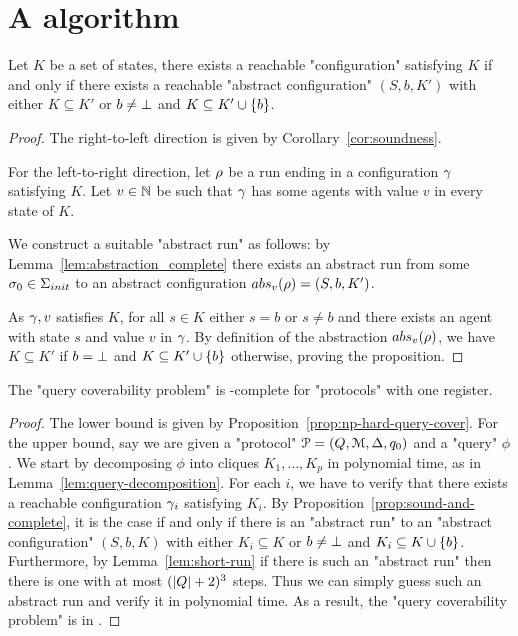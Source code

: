 \section{A \NP algorithm}

\begin{proposition}
	\label{prop:sound-and-complete}
	Let $K$ be a set of states, there exists a reachable "configuration" satisfying $K$ if and only if there exists a reachable "abstract configuration" $(S,b,K')$ with either $K \subseteq K'$ or $b \neq \bot$ and $K \subseteq K' \cup \{b\}$.  
\end{proposition}

\begin{proof}
	The right-to-left direction is given by Corollary~\ref{cor:soundness}.
	
	For the left-to-right direction, let $\rho$ be a run ending in a configuration $\gamma$ satisfying $K$. Let $v \in \mathbb{N}$ be such that $\gamma$ has some agents with value $v$ in every state of $K$.
	
	We construct a suitable "abstract run" as follows: by Lemma~\ref{lem:abstraction_complete} there exists an abstract run from some $\sigma_0 \in \aconfiginitset$ to an abstract configuration $\absproj{v}{\run} = (S, b, K')$.
	
	As $\gamma, v$ satisfies $K$, for all $s \in K$ either $s = b$ or $s \neq b$ and there exists an agent with state $s$ and value $v$ in $\gamma$. 	
	By definition of the abstraction $\absproj{v}{\run}$, we have $K \subseteq K'$ if $b=\bot$ and $K \subseteq K' \cup \{b\}$ otherwise, proving the proposition.
\end{proof}

\begin{theorem}
	\label{thm:np-complete-query-cover}
	The "query coverability problem" is \NP-complete for "protocols" with one register.
\end{theorem}

\begin{proof}
	The lower bound is given by Proposition~\ref{prop:np-hard-query-cover}.
	For the upper bound, say we are given a "protocol" $\mathcal{P} = (Q, \mathcal{M}, \Delta, q_0)$ and a "query" $\phi$.
	We start by decomposing $\phi$ into cliques $K_1, \ldots, K_p$ in polynomial time, as in Lemma~\ref{lem:query-decomposition}.
	For each $i$, we have to verify that there exists a reachable configuration $\gamma_i$ satisfying $K_i$. By Proposition~\ref{prop:sound-and-complete}, it is the case if and only if there is an "abstract run" to an "abstract configuration" $(S,b, K)$ with either $K_i \subseteq K$ or $b\neq \bot$ and $K_i \subseteq K\cup\{b\}$.
	Furthermore, by Lemma~\ref{lem:short-run} if there is such an "abstract run" then there is one with at most $(|Q|+2)^3$ steps. 
	Thus we can simply guess such an abstract run and verify it in polynomial time.
	As a result, the "query coverability problem" is in \NP. 
\end{proof}